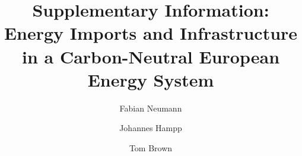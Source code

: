 \documentclass[3p,11pt]{elsarticle}
\begin{document}
\begin{frontmatter}

	\title{Supplementary Information:\\Energy Imports and Infrastructure in a Carbon-Neutral European Energy System}

	\author[tub]{Fabian Neumann}
	\author[pik]{Johannes Hampp}
	\author[tub]{Tom Brown}

	\address[tub]{Department of Digital Transformation in Energy Systems, Institute of Energy Technology,\\Technische Universität Berlin, Fakultät III, Einsteinufer 25 (TA 8), 10587 Berlin, Germany}
	\address[pik]{Potsdam Institute for Climate Impact Research (PIK), Member of the Leibniz Association, P.O.~Box 60 12 03, 14412 Potsdam, Germany}

\end{frontmatter}


\renewcommand{\figurename}{Supplementary Figure}

\renewcommand{\tablename}{Supplementary Table}

\setcounter{equation}{0}
\setcounter{figure}{0}
\setcounter{table}{0}
\setcounter{section}{0}



\end{document}
